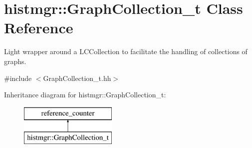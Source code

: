 \section{histmgr\-:\-:Graph\-Collection\-\_\-t Class Reference}
\label{classhistmgr_1_1GraphCollection__t}


Light wrapper around a L\-C\-Collection to facilitate the handling of collections of graphs.  




{\ttfamily \#include $<$Graph\-Collection\-\_\-t.\-hh$>$}

Inheritance diagram for histmgr\-:\-:Graph\-Collection\-\_\-t\-:\begin{figure}[H]
\begin{center}
\leavevmode
\includegraphics[height=2.000000cm]{classhistmgr_1_1GraphCollection__t}
\end{center}
\end{figure}
